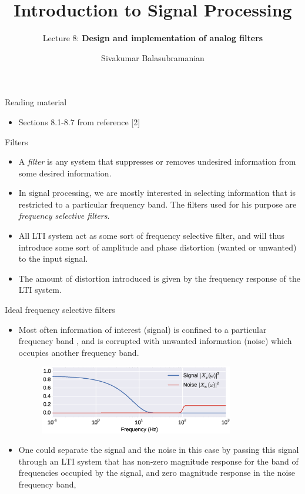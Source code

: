 \documentclass{beamer}
\title{Introduction to Signal Processing}
\subtitle{Lecture 8: \textbf{Design and implementation of analog filters}}
\author{Sivakumar Balasubramanian}
\institute[Christian Medical College] %
{
  \inst{}%
  Department of Bioengineering\\
  Christian Medical College, Bagayam\\
  Vellore 632002
}
\date{}
\begin{document}

\begin{frame}
  \titlepage
\end{frame}

\begin{frame}{Reading material}

\begin{itemize}
\item Sections 8.1-8.7 from reference [2]
\end{itemize}

\end{frame}

\begin{frame}{Filters}

\begin{itemize}
\item A \textit{filter} is any system that suppresses or removes undesired information from some desired information.
\item In signal processing, we are mostly interested in selecting information that is restricted to a particular frequency band. The filters used for his purpose are \textit{frequency selective filters}.
\item All LTI system act as some sort of frequency selective filter, and will thus introduce some sort of amplitude and phase distortion (wanted or unwanted) to the input signal.
\item The amount of distortion introduced is given by the frequency response of the LTI system.
\end{itemize}
\end{frame}

\begin{frame}{Ideal frequency selective filters}

\begin{itemize}
\item Most often information of interest (signal) is confined to a particular frequency band , and is corrupted with unwanted information (noise) which occupies another frequency band.
\begin{figure}
\centering
\includegraphics[width=0.8\textwidth]{img/sig_noise_sep.eps}
\end{figure}
\item One could separate the signal and the noise in this case by passing this signal through an LTI system that has non-zero magnitude response for the band of frequencies occupied by the signal, and zero magnitude response in the noise frequency band,

\end{itemize}
\end{frame}
\end{document}
